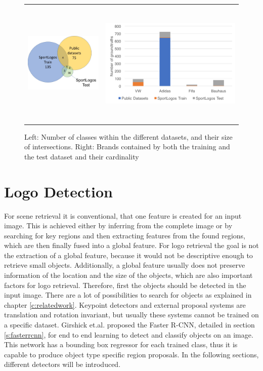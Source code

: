 \begin{figure}
  \centering
\begin{tabular}{cc}
  \includegraphics[height=40mm]{images/mt/brandintersections.jpg} &   \includegraphics[height=60mm]{images/mt/commonbrands.png}
\end{tabular}
\caption{Left: Number of classes within the different datasets, and their size of intersections. Right: Brands contained by both the training and the test dataset and their cardinality}
\label{f:commonbrands}
\end{figure}
\section{Logo Detection}\label{s:logodetection}
For scene retrieval it is conventional, that one feature is created for an input image. This is achieved either by inferring from the complete image or by searching for key regions and then extracting features from the found regions, which are then finally fused into a global feature. For logo retrieval the goal is not the extraction of a global feature, because it would not be descriptive enough to retrieve small objects. Additionally, a global feature usually does not preserve information of the location and the size of the objects, which are also important factors for logo retrieval.
\bigbreak
Therefore, first the objects should be detected in the input image. There are a lot of possibilities to search for objects as explained in chapter \ref{c:relatedwork}. Keypoint detectors and external proposal systems are translation and rotation invariant, but usually these systems cannot be trained on a specific dataset. Girshick et.al. \cite{NIPS2015_5638} proposed the Faster R-CNN, detailed in section \ref{s:fasterrcnn}, for end to end learning to detect and classify objects on an image. This network has a bounding box regressor for each trained class, thus it is capable to produce object type specific region proposals.
\bigbreak
In the following sections, different detectors will be introduced.
\bigbreak
